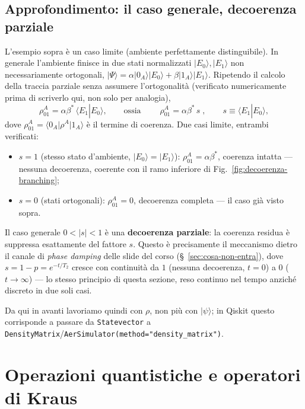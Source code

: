 \documentclass[11pt,a4paper]{article}
\newcommand{\ket}[1]{\lvert #1 \rangle}
\newcommand{\bra}[1]{\langle #1 \rvert}
\newcommand{\braket}[1]{\langle #1 \rangle}
\begin{document}
\subsection{Approfondimento: il caso generale, decoerenza parziale}

L'esempio sopra è un caso limite (ambiente perfettamente distinguibile). In generale
l'ambiente finisce in due stati normalizzati $\ket{E_0},\ket{E_1}$ non necessariamente
ortogonali, $\ket\Psi=\alpha\ket{0_A}\ket{E_0}+\beta\ket{1_A}\ket{E_1}$. Ripetendo il
calcolo della traccia parziale senza assumere l'ortogonalità (verificato numericamente
prima di scriverlo qui, non solo per analogia),
\begin{equation}
\rho^A_{01} = \alpha\beta^*\,\braket{E_1|E_0}, \qquad\text{ossia}\qquad
\boxed{\;\rho^A_{01} = \alpha\beta^*\, s\;}, \qquad s\equiv\braket{E_1|E_0},
\end{equation}
dove $\rho^A_{01}=\bra{0_A}\rho^A\ket{1_A}$ è il termine di coerenza. Due casi limite,
entrambi verificati:
\begin{itemize}[leftmargin=1.3em,itemsep=0.15em]
\item $s=1$ (stesso stato d'ambiente, $\ket{E_0}=\ket{E_1}$): $\rho^A_{01}=\alpha\beta^*$,
coerenza intatta --- nessuna decoerenza, coerente con il ramo inferiore di
Fig.~\ref{fig:decoerenza-branching};
\item $s=0$ (stati ortogonali): $\rho^A_{01}=0$, decoerenza completa --- il caso
già visto sopra.
\end{itemize}
Il caso generale $0<|s|<1$ è una \textbf{decoerenza parziale}: la coerenza residua è
suppressa esattamente del fattore $s$. Questo è precisamente il meccanismo dietro il
canale di \emph{phase damping} delle slide del corso (\S~\ref{sec:cosa-non-entra}),
dove $s=1-p=e^{-t/T_2}$ cresce con continuità da $1$ (nessuna decoerenza, $t=0$) a $0$
($t\to\infty$) --- lo stesso principio di questa sezione, reso continuo nel tempo
anziché discreto in due soli casi.

Da qui in avanti lavoriamo quindi con $\rho$, non più con $\ket{\psi}$; in
Qiskit questo corrisponde a passare da \texttt{Statevector} a
\texttt{DensityMatrix}/\texttt{AerSimulator(method="density\_matrix")}.

\section{Operazioni quantistiche e operatori di Kraus}
\label{sec:kraus}
\end{document}
